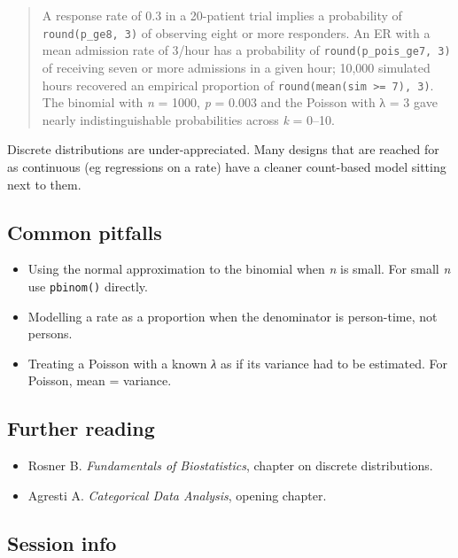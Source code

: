 \documentclass[
]{article}
\providecommand{\tightlist}{%
  \setlength{\itemsep}{0pt}\setlength{\parskip}{0pt}}
\begin{document}
\begin{quote}
A response rate of 0.3 in a 20-patient trial implies a probability of
\texttt{round(p\_ge8,\ 3)} of observing eight or more responders. An ER
with a mean admission rate of 3/hour has a probability of
\texttt{round(p\_pois\_ge7,\ 3)} of receiving seven or more admissions
in a given hour; 10,000 simulated hours recovered an empirical
proportion of \texttt{round(mean(sim\ \textgreater{}=\ 7),\ 3)}. The
binomial with \emph{n} = 1000, \emph{p} = 0.003 and the Poisson with λ =
3 gave nearly indistinguishable probabilities across \emph{k} = 0--10.
\end{quote}

Discrete distributions are under-appreciated. Many designs that are
reached for as continuous (eg regressions on a rate) have a cleaner
count-based model sitting next to them.

\subsection{Common pitfalls}\label{common-pitfalls}

\begin{itemize}
\tightlist
\item
  Using the normal approximation to the binomial when \emph{n} is small.
  For small \emph{n} use \texttt{pbinom()} directly.
\item
  Modelling a rate as a proportion when the denominator is person-time,
  not persons.
\item
  Treating a Poisson with a known \emph{λ} as if its variance had to be
  estimated. For Poisson, mean = variance.
\end{itemize}

\subsection{Further reading}\label{further-reading}

\begin{itemize}
\tightlist
\item
  Rosner B. \emph{Fundamentals of Biostatistics}, chapter on discrete
  distributions.
\item
  Agresti A. \emph{Categorical Data Analysis}, opening chapter.
\end{itemize}

\subsection{Session info}\label{session-info}
\end{document}
